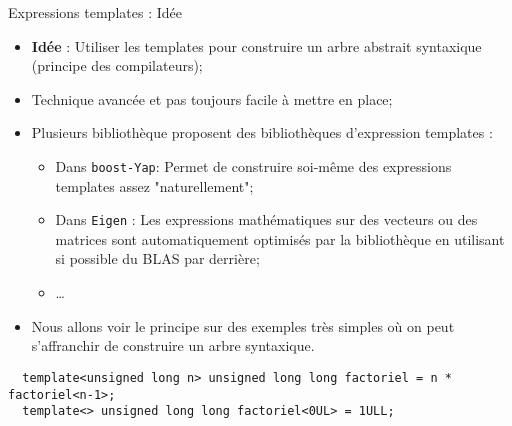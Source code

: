 \documentclass[compress,10pt,aspectratio=169]{beamer}
\begin{document}
  \begin{frame}[fragile]{Expressions templates : Idée}
  \scriptsize\vspace*{-4mm}
  
  \begin{itemize}
  \item \textbf{\textcolor{NavyBlue}{Idée}} : Utiliser les templates pour construire
        un arbre abstrait syntaxique (principe des compilateurs); 
  \item Technique avancée et pas toujours facile à mettre en place;
  \item Plusieurs bibliothèque proposent des bibliothèques d'expression templates :
  \begin{itemize}
  \scriptsize
  \item Dans \texttt{boost-Yap}: Permet de construire soi-même des expressions templates
        assez "naturellement";
  \item Dans \texttt{Eigen} : Les expressions mathématiques sur des vecteurs ou des matrices
        sont automatiquement optimisés par la bibliothèque en utilisant si possible du BLAS par derrière;
  \item \ldots
  \end{itemize}
  \item Nous allons voir le principe sur des exemples très simples où on peut s'affranchir
        de construire un arbre syntaxique.
  \end{itemize}

  \begin{verbatim}
  template<unsigned long n> unsigned long long factoriel = n * factoriel<n-1>;
  template<> unsigned long long factoriel<0UL> = 1ULL;
  \end{verbatim}
  \end{frame}
\end{document}
